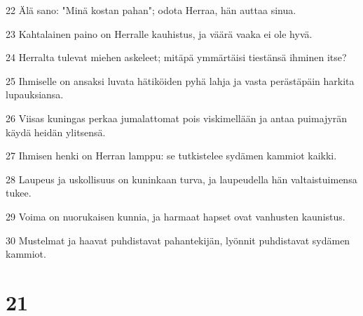 \par 22 Älä sano: "Minä kostan pahan"; odota Herraa, hän auttaa sinua.
\par 23 Kahtalainen paino on Herralle kauhistus, ja väärä vaaka ei ole hyvä.
\par 24 Herralta tulevat miehen askeleet; mitäpä ymmärtäisi tiestänsä ihminen itse?
\par 25 Ihmiselle on ansaksi luvata hätiköiden pyhä lahja ja vasta perästäpäin harkita lupauksiansa.
\par 26 Viisas kuningas perkaa jumalattomat pois viskimellään ja antaa puimajyrän käydä heidän ylitsensä.
\par 27 Ihmisen henki on Herran lamppu: se tutkistelee sydämen kammiot kaikki.
\par 28 Laupeus ja uskollisuus on kuninkaan turva, ja laupeudella hän valtaistuimensa tukee.
\par 29 Voima on nuorukaisen kunnia, ja harmaat hapset ovat vanhusten kaunistus.
\par 30 Mustelmat ja haavat puhdistavat pahantekijän, lyönnit puhdistavat sydämen kammiot.

\chapter{21}

